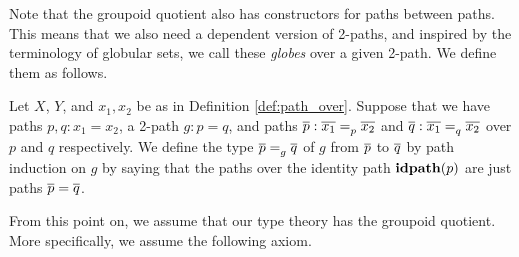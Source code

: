 Note that the groupoid quotient also has constructors for paths between paths.
This means that we also need a dependent version of 2-paths,
and inspired by the terminology of globular sets, we call these \emph{globes} over a given 2-path.
We define them as follows.

\begin{definition}
\label{def:globe_over}
Let $X$, $Y$, and $x_1, x_2$ be as in Definition \ref{def:path_over}.
Suppose that we have paths $p, q : x_1 = x_2$,
a 2-path $g : p = q$,
and paths $\pover{p} : \pathover{p}{\overline{x_1}}{\overline{x_2}}$ and $\pover{q} : \pathover{q}{\overline{x_1}}{\overline{x_2}}$ over $p$ and $q$ respectively.
We define the type $\globeover{g}{\pover{p}}{\pover{q}}$ of  $g$ from $\pover{p}$ to $\pover{q}$ by path induction on $g$
by saying that the paths over the identity path $\refl{p}$ are just paths $\pover{p} = \pover{q}$.
\end{definition}

From this point on, we assume that our type theory has the groupoid quotient.
More specifically, we assume the following axiom.


